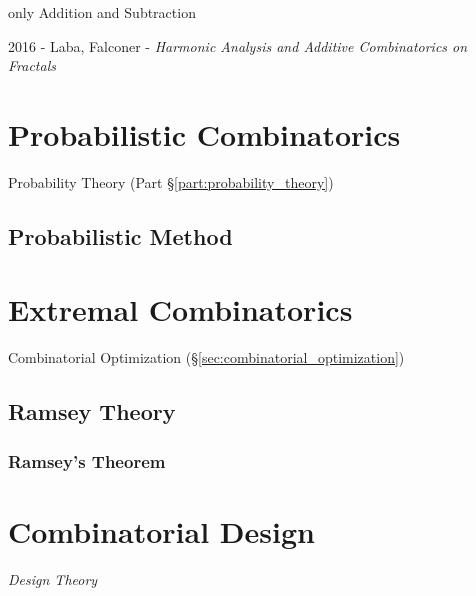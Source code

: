 only Addition and Subtraction

2016 - Laba, Falconer - \emph{Harmonic Analysis and Additive Combinatorics on
  Fractals}



\section{Probabilistic Combinatorics}\label{sec:probabilistic_combinatorics}

Probability Theory (Part \S\ref{part:probability_theory})



\subsection{Probabilistic Method}\label{sec:probabilistic_method}



\section{Extremal Combinatorics}\label{sec:extremal_combinatorics}

Combinatorial Optimization (\S\ref{sec:combinatorial_optimization})



\subsection{Ramsey Theory}\label{sec:ramsey_theory}

\subsubsection{Ramsey's Theorem}\label{sec:ramseys_theorem}



\section{Combinatorial Design}\label{sec:combinatorial_design}

\emph{Design Theory}
